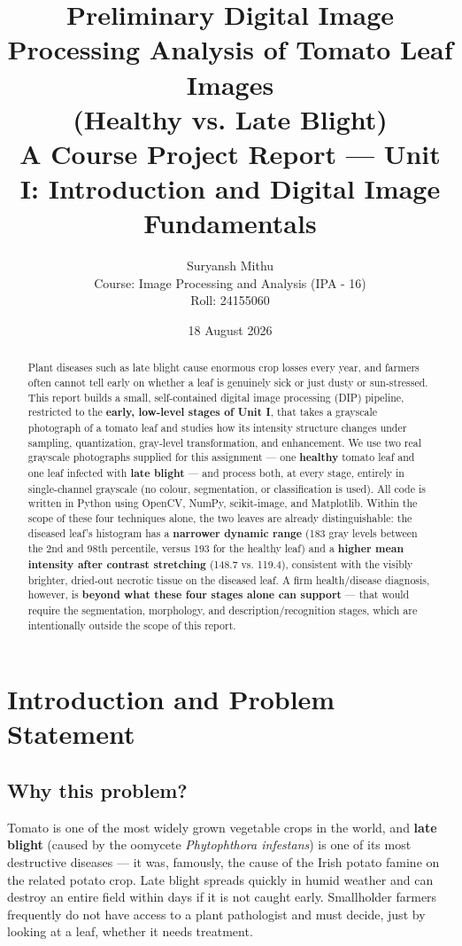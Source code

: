 \documentclass[11pt,a4paper]{article}
\title{Preliminary Digital Image Processing Analysis of Tomato Leaf Images \\ (Healthy vs. Late Blight) \\[0.3em]
\large A Course Project Report --- Unit I: Introduction and Digital Image Fundamentals}
\author{Suryansh Mithu \\ Course: Image Processing and Analysis (IPA - 16) \\ Roll: 24155060}
\date{18 August 2026}
\begin{document}
\maketitle

\begin{abstract}
Plant diseases such as late blight cause enormous crop losses every year, and farmers often cannot tell early on whether a leaf is genuinely sick or just dusty or sun-stressed. This report builds a small, self-contained digital image processing (DIP) pipeline, restricted to the \textbf{early, low-level stages of Unit I}, that takes a grayscale photograph of a tomato leaf and studies how its intensity structure changes under sampling, quantization, gray-level transformation, and enhancement. We use two real grayscale photographs supplied for this assignment --- one \textbf{healthy} tomato leaf and one leaf infected with \textbf{late blight} --- and process both, at every stage, entirely in single-channel grayscale (no colour, segmentation, or classification is used). All code is written in Python using OpenCV, NumPy, scikit-image, and Matplotlib. Within the scope of these four techniques alone, the two leaves are already distinguishable: the diseased leaf's histogram has a \textbf{narrower dynamic range} (183 gray levels between the 2nd and 98th percentile, versus 193 for the healthy leaf) and a \textbf{higher mean intensity after contrast stretching} (148.7 vs. 119.4), consistent with the visibly brighter, dried-out necrotic tissue on the diseased leaf. A firm health/disease diagnosis, however, is \textbf{beyond what these four stages alone can support} --- that would require the segmentation, morphology, and description/recognition stages, which are intentionally outside the scope of this report.
\end{abstract}

\section{Introduction and Problem Statement}

\subsection{Why this problem?}

Tomato is one of the most widely grown vegetable crops in the world, and \textbf{late blight} (caused by the oomycete \textit{Phytophthora infestans}) is one of its most destructive diseases --- it was, famously, the cause of the Irish potato famine on the related potato crop. Late blight spreads quickly in humid weather and can destroy an entire field within days if it is not caught early. Smallholder farmers frequently do not have access to a plant pathologist and must decide, just by looking at a leaf, whether it needs treatment.
\end{document}
